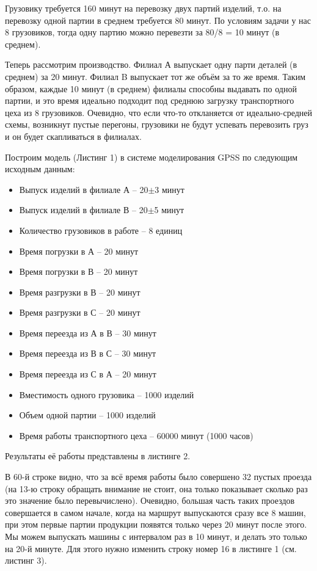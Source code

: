 \documentclass[a4paper, 12pt]{article}        %
\begin{document}
Грузовику требуется 160 минут на перевозку двух партий изделий, т.о. на перевозку одной партии в среднем требуется 80 минут. По условиям задачи у нас 8 грузовиков, тогда одну партию можно перевезти за 80/8 = 10 минут (в среднем).

Теперь рассмотрим производство. Филиал А выпускает одну парти деталей (в среднем) за 20 минут. Филиал B выпускает тот же объём за то же время. Таким образом, каждые 10 минут (в среднем) филиалы способны выдавать по одной партии, и это время идеально подходит под среднюю загрузку транспортного цеха из 8 грузовиков. Очевидно, что если что-то откланяется от идеально-средней схемы, возникнут пустые перегоны, грузовики не будут успевать перевозить груз и он будет скапливаться в филиалах.

Построим модель (Листинг 1) в системе моделирования GPSS по следующим исходным данным:
\begin{itemize}
\item Выпуск изделий в филиале А -- 20$\pm$3 минут
\item Выпуск изделий в филиале В -- 20$\pm$5 минут
\item Количество грузовиков в работе -- 8 единиц
\item Время погрузки в А -- 20 минут
\item Время погрузки в В -- 20 минут
\item Время разгрузки в В -- 20 минут
\item Время разгрузки в С -- 20 минут
\item Время переезда из А в В -- 30 минут
\item Время переезда из В в С -- 30 минут
\item Время переезда из С в А -- 20 минут
\item Вместимость одного грузовика -- 1000 изделий
\item Объем одной партии -- 1000 изделий
\item Время работы транспортного цеха -- 60000 минут (1000 часов)
\end{itemize}



Результаты её работы представлены в листинге 2.



В 60-й строке видно, что за всё время работы было совершено 32 пустых проезда (на 13-ю строку обращать внимание не стоит, она только показывает сколько раз это значение было перевычислено). Очевидно, большая часть таких проездов совершается в самом начале, когда на маршрут выпускаются сразу все 8 машин, при этом первые партии продукции появятся только через 20 минут после этого. Мы можем выпускать машины с интервалом раз в 10 минут, и делать это только на 20-й минуте. Для этого нужно изменить строку номер 16 в листинге 1 (см. листинг 3).
\end{document}
